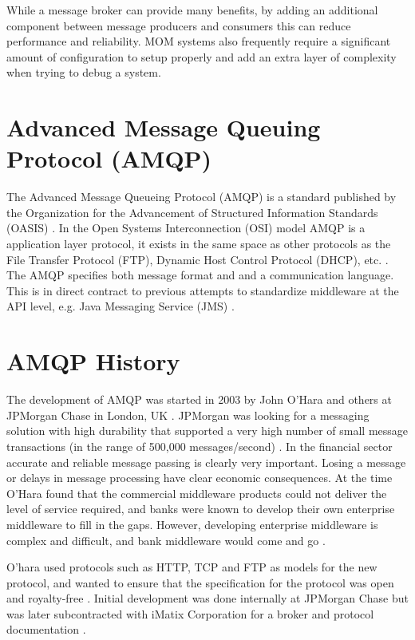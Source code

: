 \documentclass{thesis}
\begin{document}
While a message broker can provide many benefits, by adding an additional component between message producers and consumers this can reduce performance and reliability.  MOM systems also frequently require a significant amount of configuration to setup properly and add an extra layer of complexity when trying to debug a system.
 

\section{Advanced Message Queuing Protocol (AMQP)}
The Advanced Message Queueing Protocol (AMQP) is a standard published by the Organization for the Advancement of Structured Information Standards (OASIS) \cite{OASIS}.  In the Open Systems Interconnection (OSI) model AMQP is a application layer protocol, it exists in the same space as other protocols as the File Transfer Protocol (FTP), Dynamic Host Control Protocol (DHCP), etc.  \cite{WIKI_OSI}.  The AMQP specifies both message format and and a communication language.  This is in direct contract to previous attempts to standardize middleware at the API level, e.g. Java Messaging Service (JMS) \cite{ORACLE_JMS}.

\section{AMQP History}
The development of AMQP was started in 2003 by John O'Hara and others at JPMorgan Chase in London, UK \cite{O'Hara}.  JPMorgan was looking for a messaging solution with high durability that supported a very high number of small message transactions (in the range of 500,000 messages/second) \cite{Kramer}.  In the financial sector accurate and reliable message passing is clearly very important.  Losing a message or delays in message processing have clear economic consequences.  At the time O'Hara found that the commercial middleware products could not deliver the level of service required,  and banks were known to develop their own enterprise middleware to fill in the gaps. However, developing enterprise middleware is complex and difficult, and bank middleware would come and go \cite{Kramer}.

O'hara used protocols such as HTTP, TCP and FTP as models for the new protocol, and wanted to ensure that the specification for the protocol was open and royalty-free \cite{O'Hara}.  Initial development was done internally at JPMorgan Chase but was later subcontracted with iMatix Corporation for a broker and protocol documentation \cite{Apps, Cameron}.
\end{document}
